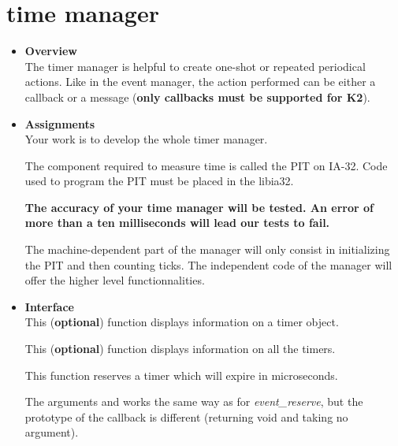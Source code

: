 \section{\textbf{time} manager}
\begin{itemize}
  \item {\bf Overview}\\

    The timer manager is helpful to create one-shot or repeated
    periodical actions. Like in the event manager, the action
    performed can be either a callback or a message (\textbf{only
    callbacks must be supported for K2}).

  \item {\bf Assignments}\\

    Your work is to develop the whole timer manager.

    The component required to measure time is called the PIT on
    IA-32. Code used to program the PIT must be placed in the libia32.

    \textbf{The accuracy of your time manager will be tested. An error
    of more than a ten milliseconds will lead our tests to fail.}

    The machine-dependent part of the manager will only consist in
    initializing the PIT and then counting ticks. The independent code
    of the manager will offer the higher level functionnalities.

  \item {\bf Interface}\\

	 {
	   This (\textbf{optional}) function displays information on a
	   timer object.
	 }

	 {
	   This (\textbf{optional}) function displays information on
	   all the timers.
	 }

	 {
	   This function reserves a timer which will expire in
	    microseconds.

	   The arguments  and  works
	   the same way as for \emph{event\_reserve}, but the
	   prototype of the callback is different (returning void and
	   taking no argument).

}
\end{itemize}

